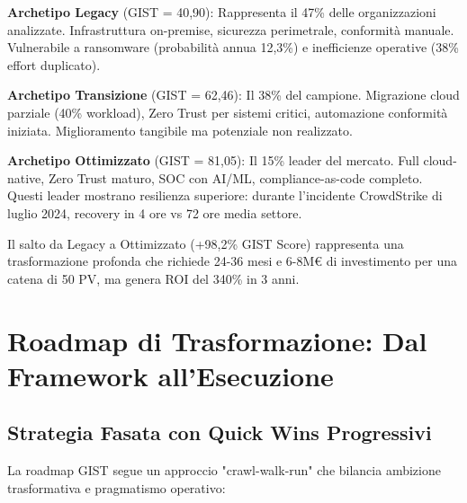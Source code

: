 \textbf{Archetipo Legacy} (GIST = 40,90): Rappresenta il 47\% delle organizzazioni analizzate. Infrastruttura on-premise, sicurezza perimetrale, conformità manuale. Vulnerabile a ransomware (probabilità annua 12,3\%) e inefficienze operative (38\% effort duplicato).

\textbf{Archetipo Transizione} (GIST = 62,46): Il 38\% del campione. Migrazione cloud parziale (40\% workload), Zero Trust per sistemi critici, automazione conformità iniziata. Miglioramento tangibile ma potenziale non realizzato.

\textbf{Archetipo Ottimizzato} (GIST = 81,05): Il 15\% leader del mercato. Full cloud-native, Zero Trust maturo, SOC con AI/ML, compliance-as-code completo. Questi leader mostrano resilienza superiore: durante l'incidente CrowdStrike di luglio 2024, recovery in 4 ore vs 72 ore media settore.

Il salto da Legacy a Ottimizzato (+98,2\% GIST Score) rappresenta una trasformazione profonda che richiede 24-36 mesi e 6-8M€ di investimento per una catena di 50 PV, ma genera ROI del 340\% in 3 anni.

\section{\texorpdfstring{Roadmap di Trasformazione: Dal Framework all'Esecuzione}{5.4 - Roadmap di Trasformazione}}
\label{sec:5.4}

\subsection{\texorpdfstring{Strategia Fasata con Quick Wins Progressivi}{5.4.1 - Strategia Fasata}}
\label{subsec:5.4.1}

La roadmap GIST segue un approccio "crawl-walk-run" che bilancia ambizione trasformativa e pragmatismo operativo:

